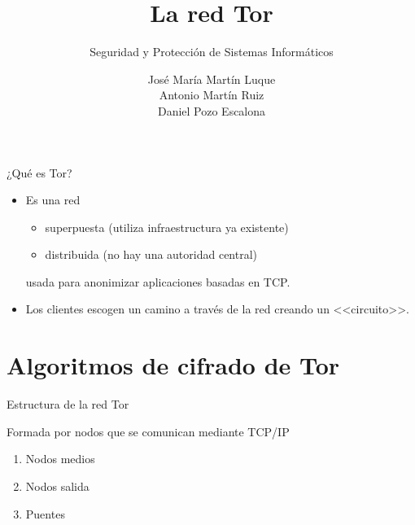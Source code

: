 \documentclass[spanish]{beamer}
\title{La red Tor}
\subtitle{Seguridad y Protección de Sistemas Informáticos}
\author{
  José María Martín Luque \texorpdfstring{\\}{}
  Antonio Martín Ruiz \texorpdfstring{\\}{}
  Daniel Pozo Escalona
}
\begin{document}
\maketitle

\begin{frame}{¿Qué es Tor?}

  \begin{itemize}
    \item Es una red \begin{itemize}
      \item superpuesta (utiliza infraestructura ya existente)
      \item distribuida (no hay una autoridad central)
    \end{itemize} usada para anonimizar aplicaciones basadas en TCP.
    \item Los clientes escogen un camino a través de la red creando un <<circuito>>.
  \end{itemize}

\end{frame}

\section{Algoritmos de cifrado de Tor}

\begin{frame}{Estructura de la red Tor}

Formada por nodos que se comunican mediante TCP/IP

  \begin{enumerate}

    \item Nodos medios

    \item Nodos salida

    \item Puentes

  \end{enumerate}

\end{frame}
\end{document}
